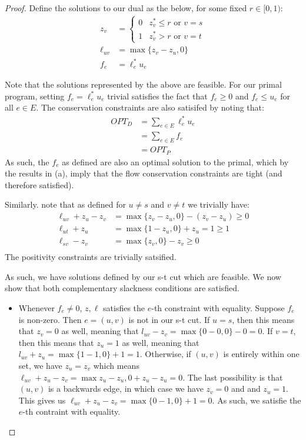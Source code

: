 \documentclass[12pt]{exam}
\begin{document}
\begin{questions}
\begin{solution}
\begin{enumerate}[label=(\alph*)]
\begin{proof}
      Define the solutions to our dual as the below, for some fixed $r \in [0, 1)$:
      \begin{align*}
        z_v &= \begin{cases}
          0 & z_v^*\leq r \text{ or } v = s \\
          1 & z_v^* > r \text{ or } v = t
        \end{cases} \\
        \ell_{uv} &= \max\{z_v - z_u, 0\} \\
        f_e &= \ell^*_e u_e
      \end{align*}

      Note that the solutions represented by the above are feasible. For our primal program, setting $f_e = \ell_e^* u_e$ trivial satisfies the fact that $f_e \geq 0$ and $f_e \leq u_e$ for all $e \in E$. The conservation constraints are also satisifed by noting that:
      \begin{align*}
        OPT_D &= \sum_{e \in E} \ell_e^* u_e \tag{Definition of dual} \\
        &= \sum_{e \in E} f_e \tag{Definition of $f_e$} \\
        &= OPT_P \tag{Strong duality}
      \end{align*}
      As such, the $f_e$ as defined are also an optimal solution to the primal, which by the results in (a), imply that the flow conservation constraints are tight (and therefore satisfied).

      Similarly. note that as defined for $u \neq s$ and $v \neq t$ we trivially have:
      \begin{align*}
        \ell_{uv} + z_u - z_v &= \max\{z_v - z_u, 0\} - (z_v - z_u) \geq 0 \\
        \ell_{ut} + z_u &= \max\{ 1 - z_u, 0\} + z_u = 1 \geq 1 \\
        \ell_{sv} - z_v &= \max\{ z_v, 0\} - z_v \geq 0 \\
      \end{align*}
      The positivity constraints are trivially satsified.

      As such, we have solutions defined by our s-t cut which are feasible. We now show that both complementary slackness conditions are satisfied.
      \begin{itemize}
        \item Whenever $f_e \neq 0$, $z,\ell$ satisfies the $e$-th constraint with equality. Suppose $f_e$ is non-zero. Then $e = (u,v)$ is not in our s-t cut. If $u = s$, then this means that $z_v = 0$ as well, meaning that $l_{uv} - z_v = \max\{ 0 - 0, 0\} - 0 = 0$. If $v = t$, then this means that $z_u = 1$ as well, meaning that $l_{uv} + z_u = \max\{ 1 - 1, 0\} + 1 = 1$. Otherwise, if $(u,v)$ is entirely within one set, we have $z_u = z_v$ which means $\ell_{uv} + z_u - z_v = \max{ z_u - z_u, 0} + z_u - z_u = 0$. The last possibility is that $(u,v)$ is a backwards edge, in which case we have $z_v = 0$ and and $z_u = 1$. This gives us $\ell_{uv} + z_u - z_v = \max\{ 0-1, 0 \} + 1 = 0$. As such, we satisfie the $e$-th contraint with equality.


\end{itemize}
\end{proof}
\end{enumerate}
\end{solution}
\end{questions}
\end{document}
